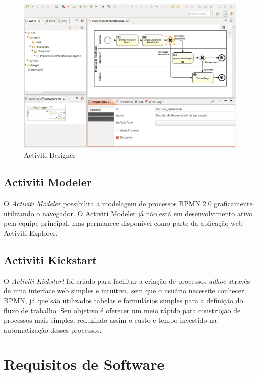 \begin{figure}[H]
\centering
\includegraphics[width=1\textwidth]{imagens/activiti_designer.png}
\caption{Activiti Designer}
\label{fig:activiti_designer}
\end{figure}

\subsection{Activiti Modeler}\label{sec:automatizacao_processos-gestao_processos_activiti_modeler}

O \textit{Activiti Modeler} possibilita a modelagem de processos BPMN 2.0 graficamente utilizando o navegador. O Activiti Modeler já não está em desenvolvimento ativo pela equipe principal, mas permanece disponível como parte da aplicação web Activiti Explorer.

\subsection{Activiti Kickstart}\label{sec:automatizacao_processos-gestao_processos_activiti_kickstart}

O \textit{Activiti Kickstart} foi criado para facilitar a criação de processos \textit{adhoc} através de uma interface web simples e intuitiva, sem que o usuário necessite conhecer BPMN, já que são utilizados tabelas e formulários simples para a definição do fluxo de trabalho. Seu objetivo é oferecer um meio rápido para construção de processos mais simples, reduzindo assim o custo e tempo investido na automatização desses processos.

\section{Requisitos de Software}\label{sec:automatizacao_processos-requisitos}

